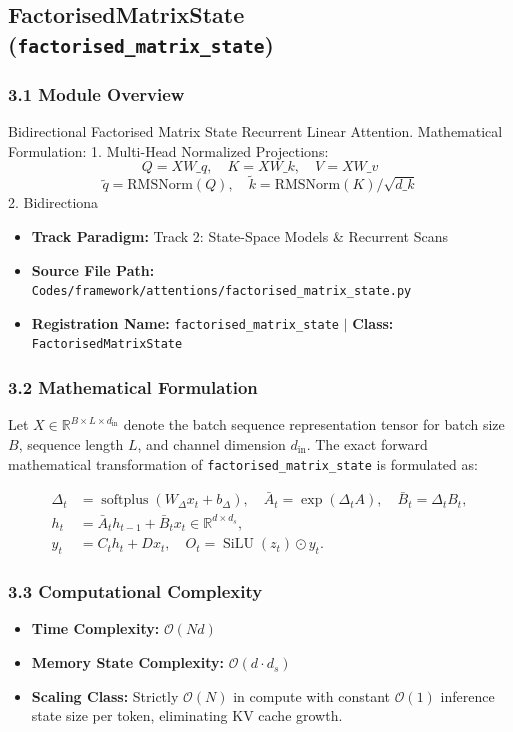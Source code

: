\subsection{FactorisedMatrixState (\texttt{factorised\_matrix\_state})}
\label{sec:app_module_factorised\_matrix\_state}

\subsubsection*{3.1 Module Overview}
Bidirectional Factorised Matrix State Recurrent Linear Attention.  Mathematical Formulation:     1. Multi-Head Normalized Projections:        $$Q = X W\_q, \quad K = X W\_k, \quad V = X W\_v$$        $$\tilde{q} = \text{RMSNorm}(Q), \quad \tilde{k} = \text{RMSNorm}(K) / \sqrt{d\_k}$$     2. Bidirectiona
\begin{itemize}
    \item \textbf{Track Paradigm:} Track 2: State-Space Models & Recurrent Scans
    \item \textbf{Source File Path:} \texttt{Codes/framework/attentions/factorised\_matrix\_state.py}
    \item \textbf{Registration Name:} \texttt{factorised\_matrix\_state} $\mid$ \textbf{Class:} \texttt{FactorisedMatrixState}
\end{itemize}

\subsubsection*{3.2 Mathematical Formulation}
Let $X \in \mathbb{R}^{B \times L \times d_{\text{in}}}$ denote the batch sequence representation tensor for batch size $B$, sequence length $L$, and channel dimension $d_{\text{in}}$. The exact forward mathematical transformation of \texttt{factorised\_matrix\_state} is formulated as:

\begin{align}
\Delta_t &= \operatorname{softplus}(W_\Delta x_t + b_\Delta), \quad \bar{A}_t = \exp(\Delta_t A), \quad \bar{B}_t = \Delta_t B_t, \\
h_t &= \bar{A}_t h_{t-1} + \bar{B}_t x_t \in \mathbb{R}^{d \times d_s}, \\
y_t &= C_t h_t + D x_t, \quad O_t = \operatorname{SiLU}(z_t) \odot y_t.
\end{align}


\subsubsection*{3.3 Computational Complexity}
\begin{itemize}
    \item \textbf{Time Complexity:} $\mathcal{O}(N d)$
    \item \textbf{Memory State Complexity:} $\mathcal{O}(d \cdot d_s)$
    \item \textbf{Scaling Class:} Strictly $\mathcal{O}(N)$ in compute with constant $\mathcal{O}(1)$ inference state size per token, eliminating KV cache growth.
\end{itemize}


